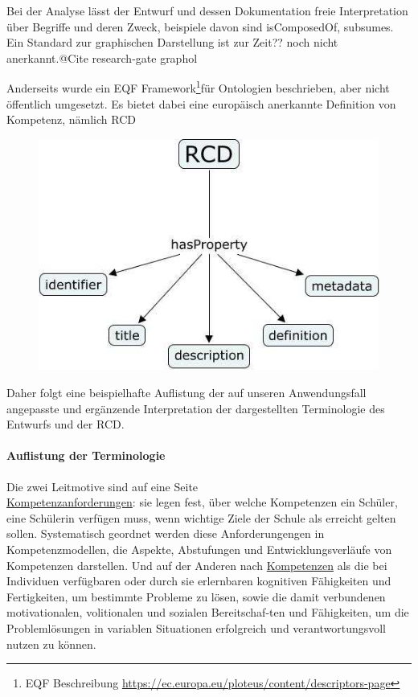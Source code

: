 \documentclass[
12pt,
english,
ngerman,
headsepline,
twoside,
openright,
numbers=noenddot,version=first
]{scrreprt}
\begin{document}
Bei der Analyse lässt der Entwurf und dessen Dokumentation freie Interpretation über Begriffe und deren Zweck, beispiele davon sind \glqq isComposedOf\grqq, \glqq subsumes\grqq. Ein Standard zur graphischen Darstellung ist zur Zeit?? noch nicht anerkannt.@Cite research-gate graphol

Anderseits wurde ein \glqq EQF Framework\footnote{EQF Beschreibung \url{https://ec.europa.eu/ploteus/content/descriptors-page}}\grqq für Ontologien beschrieben, aber nicht öffentlich umgesetzt. Es bietet dabei eine europäisch anerkannte Definition von Kompetenz, nämlich RCD\cite{EQFCompetency}

\begin{figure}
	\includegraphics[scale=0.5]{pics/RCD.jpg}
\end{figure}

Daher folgt eine beispielhafte Auflistung der auf unseren Anwendungsfall angepasste und ergänzende Interpretation der dargestellten Terminologie des Entwurfs und der RCD.

\paragraph{Auflistung der Terminologie} Die zwei Leitmotive sind auf eine Seite\\ \underline{Kompetenzanforderungen}: sie legen fest, über welche Kompetenzen ein Schüler, eine Schülerin verfügen muss, wenn wichtige Ziele der Schule als erreicht gelten sollen. Systematisch geordnet werden diese Anforderungengen in Kompetenzmodellen, die Aspekte, Abstufungen und Entwicklungsverläufe von Kompetenzen darstellen\cite{Competence}. Und auf der Anderen nach \underline{Kompetenzen} als die bei Individuen verfügbaren oder durch sie erlernbaren kognitiven Fähigkeiten und Fertigkeiten, um bestimmte Probleme zu lösen, sowie die damit verbundenen motivationalen, volitionalen und sozialen Bereitschaf-ten und Fähigkeiten, um die Problemlösungen in variablen Situationen erfolgreich und verantwortungsvoll nutzen zu können\cite{weinert2002leistungsmessungen}.
\end{document}
